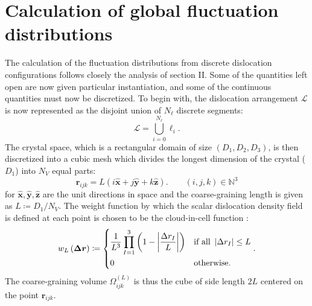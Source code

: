 \section{Calculation of global fluctuation
distributions\label{sec:4_calculation}}

The calculation of the fluctuation distributions from discrete dislocation configurations follows closely the analysis of section II. Some of the quantities left open are now given particular instantiation, and some of the continuous quantities must now be discretized. To begin with, the dislocation arrangement \(\mathcal{L}\) is now represented as the disjoint union of \(N_{\ell}\) discrete segments:
\begin{equation}
\mathcal{L}=\bigcup_{i = 0}^{N_{\ell}}\ell_{i}.
\end{equation}
The crystal space, which is a rectangular domain of size
\(\left( D_{1},D_{2},D_{3} \right)\), is then discretized into a
cubic mesh which divides the longest dimension of the crystal
(\(D_{1}\)) into \(N_{V}\) equal parts:
\begin{equation}
\boldsymbol{r}_{ijk}=L\left( i\hat{\boldsymbol{x}}+j\hat{\boldsymbol{y}} + k\hat{\boldsymbol{z}} \right).\qquad (i,j,k) \in \mathbb{N}^{3}
\end{equation}
for $\hat{\boldsymbol{x}}, \hat{\boldsymbol{y}}, \hat{\boldsymbol{z}}$ are the unit directions in space and the coarse-graining length is given as \(L \coloneqq D_{1}/N_{V}\). The
weight function by which the scalar dislocation density field is defined
at each point is chosen to be the cloud-in-cell function \cite{Birdsall1969}:
\begin{equation}
w_{L}\left( \boldsymbol{\Delta}\boldsymbol{r} \right)\coloneqq \begin{dcases}
\frac{1}{L^{3}}\prod_{I = 1}^{3}\left( 1 - \left| \frac{\Delta r_{I}}{L} \right| \right) & \text{if all } \left| \Delta r_{I} \right| \leq L \\
0 & \text{otherwise}.
\end{dcases}.
\end{equation}
The coarse-graining volume \(\Omega_{ijk}^{(L)}\) is thus the cube of
side length \(2L\) centered on the point \(\boldsymbol{r}_{ijk}\).

